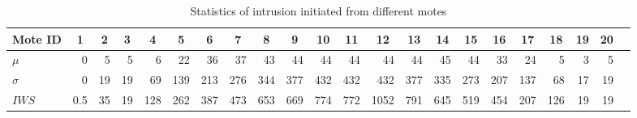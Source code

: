 \documentclass[conference,final]{IEEEtran}
\newcommand*{\bd}[1]{\multicolumn{1}{|c}{\bfseries #1}}
\begin{document}

\begin{table}[t!]
\centering
\begin{tabular}{|l|*{20}{r|}r}
\hline
\bd{Mote ID}           & \bd{1} & \bd{2} & \bd{3} & \bd{4} & \bd{5} & \bd{6} & \bd{7} & \bd{8} & \bd{9} & \bd{10} & \bd{11} & \bd{12} & \bd{13} & \bd{14} & \bd{15} & \bd{16} & \bd{17} & \bd{18} & \bd{19} & \bd{20} \\
\hline
$\mu$ 			  & 0 & 5 & 5 & 6 & 22 & 36& 37&43 &44 & 44 & 44 & 44 & 44 & 45 & 44  & 33 & 24 & 5 & 3 & 5 \\
$\sigma$            & 0 &19 & 19& 69&139 &213&276&344&377&432 &432 &432 &377 &335 &273 & 207&137 & 68 & 17 & 19 \\
$IWS$
                  &0.5&35 &19 &128&262 &387&473&653&669&774&772 &1052&791 &645 &519  &454 &207 & 126& 19 & 19 \\
\hline
\end{tabular}
\caption{Statistics of intrusion initiated from different motes}
\label{tab:ellip}
\end{table}
\end{document}
